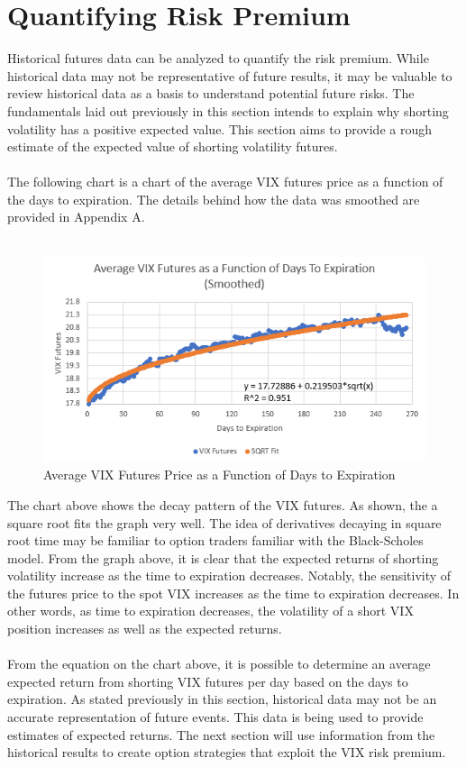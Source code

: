 \documentclass[11pt, oneside]{book}
\begin{document}
\section{Quantifying Risk Premium} \label{Futures-Quantify}
Historical futures data can be analyzed to quantify the risk premium. While historical data may not be representative of future results, it may be valuable to review historical data as a basis to understand potential future risks. The fundamentals laid out previously in this section intends to explain why shorting volatility has a positive expected value. This section aims to provide a rough estimate of the expected value of shorting volatility futures. \\
\\
The following chart is a chart of the average VIX futures price as a function of the days to expiration. The details behind how the data was smoothed are provided in Appendix A. 
\\
\\
\begin{figure}[H]
\centering
\includegraphics[width=\textwidth]{VIXFuturesAsAFunctionOfDaysToExpiration.png}
\caption{Average VIX Futures Price as a Function of Days to Expiration} \label{Fig-AvgVIXDaysToExpiration}
\end{figure}
\noindent
The chart above shows the decay pattern of the VIX futures. As shown, the a square root fits the graph very well. The idea of derivatives decaying in square root time may be familiar to option traders familiar with the Black-Scholes model. From the graph above, it is clear that the expected returns of shorting volatility increase as the time to expiration decreases. Notably, the sensitivity of the futures price to the spot VIX increases as the time to expiration decreases. In other words, as time to expiration decreases, the volatility of a short VIX position increases as well as the expected returns.\\
\\
From the equation on the chart above, it is possible to determine an average expected return from shorting VIX futures per day based on the days to expiration. As stated previously in this section, historical data may not be an accurate representation of future events. This data is being used to provide estimates of expected returns. The next section will use information from the historical results to create option strategies that exploit the VIX risk premium.
\end{document}

